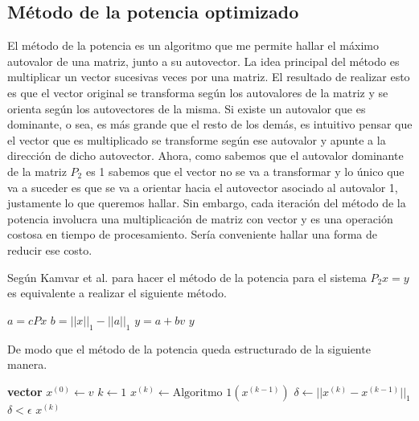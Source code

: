 \subsection{M\'etodo de la potencia optimizado}

El m\'etodo de la potencia \cite[Secci\'on 9.3]{Burden} es un algoritmo que me permite hallar el m\'aximo autovalor de una matriz, junto a su autovector. La idea principal del m\'etodo es multiplicar un vector sucesivas veces por una matriz. El resultado de realizar esto es que el vector original se transforma seg\'un los autovalores de la matriz y se orienta seg\'un los autovectores de la misma. Si existe un autovalor que es dominante, o sea, es m\'as grande que el resto de los dem\'as, es intuitivo pensar que el vector que es multiplicado se transforme seg\'un ese autovalor y apunte a la direcci\'on de dicho autovector. Ahora, como sabemos que el autovalor dominante de la matriz $P_{2}$ es 1 sabemos que el vector no se va a transformar y lo \'unico que va a suceder es que se va a orientar hacia el autovector asociado al autovalor 1, justamente lo que queremos hallar. Sin embargo, cada iteraci\'on del m\'etodo de la potencia involucra una multiplicaci\'on de matriz con vector y es una operaci\'on costosa en tiempo de procesamiento. Ser\'ia conveniente hallar una forma de reducir ese costo.

Seg\'un Kamvar et al. \cite[Algoritmo 1]{Kamvar2003} para hacer el m\'etodo de la potencia para el sistema $P_{2}x = y$ es equivalente a realizar el siguiente m\'etodo.

\vspace{0.5cm}

\begin{algorithmic}
		\State $a = cPx$
		\State $b = ||x||_{1} - ||a||_{1}$
		\State $y = a + bv$
		\State \Return $y$
	\EndFunction
\end{algorithmic}

\vspace{0.5cm}

De modo que el m\'etodo de la potencia queda estructurado de la siguiente manera.

\vspace{0.5cm}

\begin{algorithmic}
		\State \textbf{vector} $x^{(0)} \gets v$
		\State $k \gets 1$ \Repeat
		\State $x^{(k)} \gets \text{Algoritmo 1}(x^{(k-1)})$
		\State $\delta \gets ||x^{(k)} - x^{(k-1)}||_{1}$ \Until $\delta < \epsilon$
		\State \Return $x^{(k)}$
	\EndFunction
\end{algorithmic}


